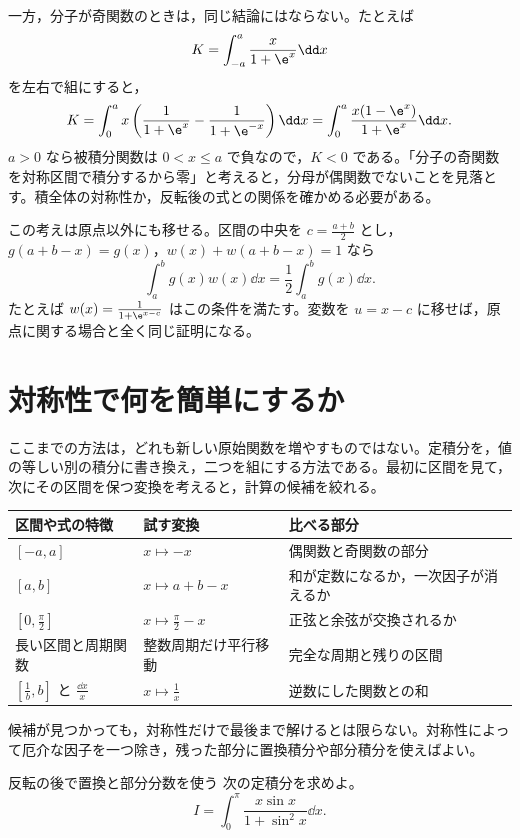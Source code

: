 一方，分子が奇関数のときは，同じ結論にはならない。たとえば
\[
K=\int_{-a}^a\frac{x}{1+\e^x}\dd x
\]
を左右で組にすると，
\[
K=\int_0^a x\left(\frac{1}{1+\e^x}-\frac{1}{1+\e^{-x}}\right)\dd x
 =\int_0^a\frac{x(1-\e^x)}{1+\e^x}\dd x.
\]
$a>0$ なら被積分関数は $0<x\leq a$ で負なので，$K<0$ である。「分子の奇関数を対称区間で積分するから零」と考えると，分母が偶関数でないことを見落とす。積全体の対称性か，反転後の式との関係を確かめる必要がある。

この考えは原点以外にも移せる。区間の中央を $c=\frac{a+b}{2}$ とし，$g(a+b-x)=g(x)$，$w(x)+w(a+b-x)=1$ なら
\[
\int_a^b g(x)w(x)\dd x=\frac12\int_a^b g(x)\dd x.
\]
たとえば $w(x)=\frac{1}{1+\e^{x-c}}$ はこの条件を満たす。変数を $u=x-c$ に移せば，原点に関する場合と全く同じ証明になる。

\section{対称性で何を簡単にするか}\label{節:定積分の手法選択}

ここまでの方法は，どれも新しい原始関数を増やすものではない。定積分を，値の等しい別の積分に書き換え，二つを組にする方法である。最初に区間を見て，次にその区間を保つ変換を考えると，計算の候補を絞れる。

\begin{center}
\begin{tabularx}{0.96\linewidth}{@{}lXX@{}}
\toprule
区間や式の特徴 & 試す変換 & 比べる部分\\
\midrule
$[-a,a]$ & $x\mapsto -x$ & 偶関数と奇関数の部分\\
$[a,b]$ & $x\mapsto a+b-x$ & 和が定数になるか，一次因子が消えるか\\
$\left[0,\frac{\pi}{2}\right]$ & $x\mapsto\frac{\pi}{2}-x$ & 正弦と余弦が交換されるか\\
長い区間と周期関数 & 整数周期だけ平行移動 & 完全な周期と残りの区間\\
$\left[\frac1b,b\right]$ と $\frac{\dd x}{x}$ & $x\mapsto\frac1x$ & 逆数にした関数との和\\
\bottomrule
\end{tabularx}
\end{center}

候補が見つかっても，対称性だけで最後まで解けるとは限らない。対称性によって厄介な因子を一つ除き，残った部分に置換積分や部分積分を使えばよい。

\begin{example}{反転の後で置換と部分分数を使う}
次の定積分を求めよ。
\[
I=\int_0^\pi\frac{x\sin x}{1+\sin^2x}\dd x.
\]
\end{example}

